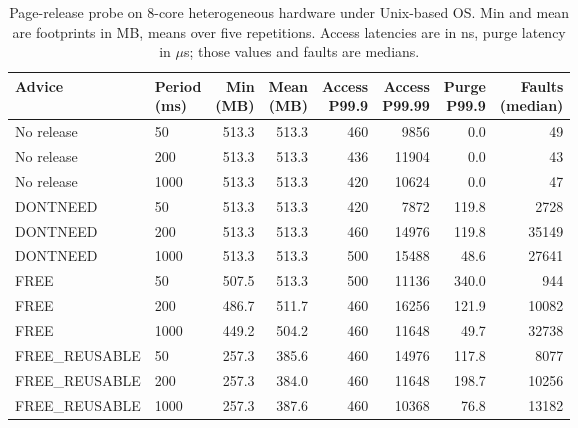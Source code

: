 \begin{table}[!htbp]
\centering
\scriptsize
\setlength{\tabcolsep}{3pt}
\caption{Page-release probe on 8-core heterogeneous hardware under Unix-based OS. Min and mean are footprints in MB, means over five repetitions. Access latencies are in ns, purge latency in $\mu$s; those values and faults are medians.}
\label{tab:purge}
\begin{tabular}{llrrrrrr}
\toprule
Advice & \shortstack{Period\\(ms)} & \shortstack{Min\\(MB)} & \shortstack{Mean\\(MB)} & \shortstack{Access\\P99.9} & \shortstack{Access\\P99.99} & \shortstack{Purge\\P99.9} & \shortstack{Faults\\(median)}\\
\midrule
No release & 50 & 513.3 & 513.3 & 460 & 9856 & 0.0 & 49 \\
No release & 200 & 513.3 & 513.3 & 436 & 11904 & 0.0 & 43 \\
No release & 1000 & 513.3 & 513.3 & 420 & 10624 & 0.0 & 47 \\
DONTNEED & 50 & 513.3 & 513.3 & 420 & 7872 & 119.8 & 2728 \\
DONTNEED & 200 & 513.3 & 513.3 & 460 & 14976 & 119.8 & 35149 \\
DONTNEED & 1000 & 513.3 & 513.3 & 500 & 15488 & 48.6 & 27641 \\
FREE & 50 & 507.5 & 513.3 & 500 & 11136 & 340.0 & 944 \\
FREE & 200 & 486.7 & 511.7 & 460 & 16256 & 121.9 & 10082 \\
FREE & 1000 & 449.2 & 504.2 & 460 & 11648 & 49.7 & 32738 \\
FREE\_REUSABLE & 50 & 257.3 & 385.6 & 460 & 14976 & 117.8 & 8077 \\
FREE\_REUSABLE & 200 & 257.3 & 384.0 & 460 & 11648 & 198.7 & 10256 \\
FREE\_REUSABLE & 1000 & 257.3 & 387.6 & 460 & 10368 & 76.8 & 13182 \\
\bottomrule
\end{tabular}
\end{table}
